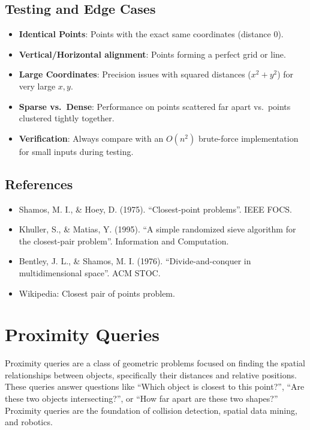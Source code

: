 \subsection{Testing and Edge Cases}

\begin{itemize}
\item \textbf{Identical Points}: Points with the exact same coordinates (distance 0).
\item \textbf{Vertical/Horizontal alignment}: Points forming a perfect grid or line.
\item \textbf{Large Coordinates}: Precision issues with squared distances ($x^2 + y^2$) for very large $x, y$.
\item \textbf{Sparse vs.\ Dense}: Performance on points scattered far apart vs.\ points clustered tightly together.
\item \textbf{Verification}: Always compare with an $O(n^2)$ brute-force implementation for small inputs during testing.
\end{itemize}

\subsection{References}

\begin{itemize}
\item Shamos, M. I., \& Hoey, D. (1975). ``Closest-point problems''. IEEE FOCS.
\item Khuller, S., \& Matias, Y. (1995). ``A simple randomized sieve algorithm for the closest-pair problem''. Information and Computation.
\item Bentley, J. L., \& Shamos, M. I. (1976). ``Divide-and-conquer in multidimensional space''. ACM STOC.
\item Wikipedia: Closest pair of points problem.
\end{itemize}


\section{Proximity Queries}
\label{sec:proximity_queries}

Proximity queries are a class of geometric problems focused on finding the spatial relationships between objects, specifically their distances and relative positions. These queries answer questions like ``Which object is closest to this point?'', ``Are these two objects intersecting?'', or ``How far apart are these two shapes?'' Proximity queries are the foundation of collision detection, spatial data mining, and robotics.

